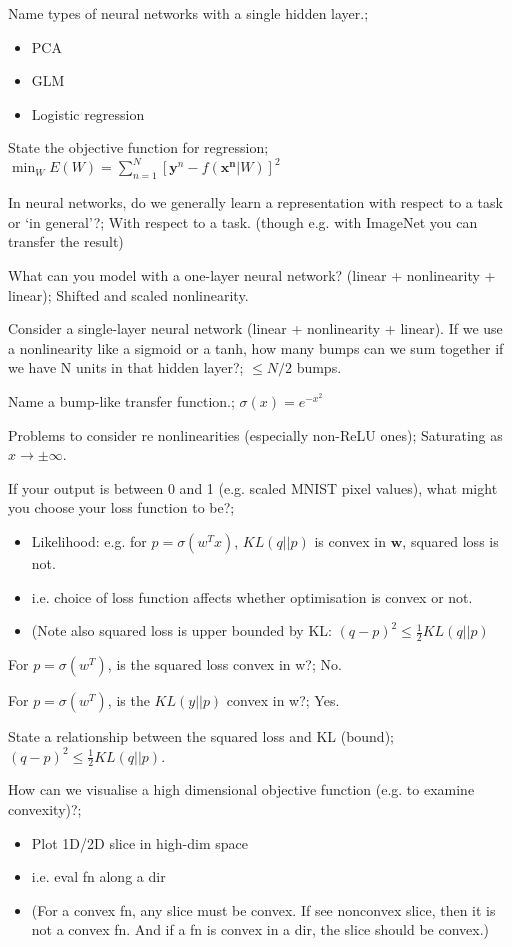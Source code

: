 \documentclass{article}
\begin{document}
Name types of neural networks with a single hidden layer.; \begin{itemize}
    \item PCA
    \item GLM
    \item Logistic regression
\end{itemize}

State the objective function for regression; $\min_W E(W) = \sum_{n=1}^N [\mathbf{y}^n - f(\mathbf{x^n}|W)]^2$

In neural networks, do we generally learn a representation with respect to a task or `in general'?; With respect to a task. (though e.g. with ImageNet you can transfer the result)

What can you model with a one-layer neural network? (linear + nonlinearity + linear); Shifted and scaled nonlinearity.

Consider a single-layer neural network (linear + nonlinearity + linear).  If we use a nonlinearity like a sigmoid or a tanh, how many bumps can we sum together if we have N units in that hidden layer?; $\leq N/2$ bumps.

Name a bump-like transfer function.; $\sigma(x) = e^{-x^2}$

Problems to consider re nonlinearities (especially non-ReLU ones); Saturating as $x\rightarrow \pm\infty$.

If your output is between 0 and 1 (e.g. scaled MNIST pixel values), what might you choose your loss function to be?; \begin{itemize}
    \item Likelihood: e.g. for $p=\sigma(w^Tx)$, $KL(q||p)$ is convex in $\mathbf{w}$, squared loss is not.
    \item i.e. choice of loss function affects whether optimisation is convex or not.
    \item (Note also squared loss is upper bounded by KL: $(q-p)^2 \leq \frac{1}{2}KL(q||p)$
\end{itemize}

For $p=\sigma(w^T)$, is the squared loss convex in w?; No.

For $p=\sigma(w^T)$, is the $KL(y||p)$ convex in w?; Yes.

State a relationship between the squared loss and KL (bound); $(q-p)^2 \leq \frac{1}{2}KL(q||p)$.

How can we visualise a high dimensional objective function (e.g. to examine convexity)?; \begin{itemize}
    \item Plot 1D/2D slice in high-dim space
    \item i.e. eval fn along a dir
    \item (For a convex fn, any slice must be convex. If see nonconvex slice, then it is not a convex fn. And if a fn is convex in a dir, the slice should be convex.)
\end{itemize}
\end{document}
